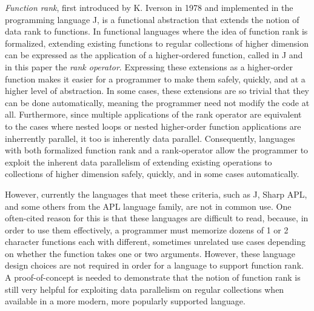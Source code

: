 \textit{Function rank}, first introduced by K. Iverson in 1978\cite{opandfunc} 
and implemented in the programming language J, 
is a functional abstraction that extends the notion of data rank to functions. 
In functional languages where the idea of function rank is formalized, 
extending existing functions to regular collections of higher dimension 
can be expressed as the application of a higher-ordered function, 
called in J and in this paper the \textit{rank operator}. \cite{jvocab}
Expressing these extensions as a higher-order function 
makes it easier for a programmer to make them safely, quickly, and at a higher level of abstraction.
In some cases, these extensions are so trivial that they can be done automatically,\cite{jvocab} \cite{rankanduni} 
meaning the programmer need not modify the code at all. 
Furthermore, since multiple applications of the rank operator 
are equivalent to the cases where nested loops or nested higher-order function applications are inherrently parallel, 
it too is inherently data parallel.
Consequently, languages with both formalized function rank and a rank-operator allow the programmer to 
exploit the inherent data parallelism of extending existing operations to collections of higher dimension 
safely, quickly, and in some cases automatically.

However, currently the languages that meet these criteria, 
such as J, Sharp APL, and some others from the APL language family, 
are not in common use. %
One often-cited reason for this is that these languages are difficult to read, %
because, in order to use them effectively, a programmer must memorize 
dozens of 1 or 2 character functions each with different, sometimes unrelated use cases 
depending on whether the function takes one or two arguments.\cite{jvocab} %
However, these language design choices are not required in order for a language to support function rank.
A proof-of-concept is needed to demonstrate that the notion of function rank %
is still very helpful for exploiting data parallelism on regular collections 
when available in a more modern, more popularly supported language.

